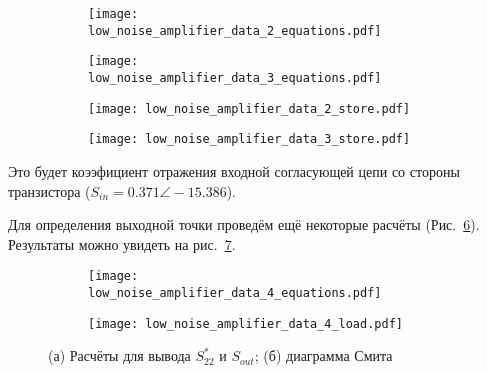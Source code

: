 \begin{figure}[!ht]
    \centering
    \begin{subfigure}[b]{0.45\textwidth}
        \centering
        \texttt{[image: low\_noise\_amplifier\_data\_2\_equations.pdf]}
        \caption{}%
        \label{fig:low_noise_amplifier_data_2_equations}
    \end{subfigure}
    \hfill
    \begin{subfigure}[b]{0.45\textwidth}
        \centering
        \texttt{[image: low\_noise\_amplifier\_data\_3\_equations.pdf]}
        \caption{}%
        \label{fig:low_noise_amplifier_data_3_equations}
    \end{subfigure}
    \vfill
    \begin{subfigure}[b]{0.45\textwidth}
        \centering
        \texttt{[image: low\_noise\_amplifier\_data\_2\_store.pdf]}
        \caption{}%
        \label{fig:low_noise_amplifier_data_2_store}
    \end{subfigure}
    \hfill
    \begin{subfigure}[b]{0.45\textwidth}
        \centering
        \texttt{[image: low\_noise\_amplifier\_data\_3\_store.pdf]}
        \caption{}%
        \label{fig:low_noise_amplifier_data_3_store}
    \end{subfigure}
\end{figure}

Это будет коээфициент отражения входной согласующей цепи со стороны транзистора ($S_{in} = 0.371 \angle -15.386$).

Для определения выходной точки проведём ещё некоторые расчёты (Рис.~\ref{fig:low_noise_amplifier_data_4_equations}). Результаты можно увидеть на рис.~\ref{fig:low_noise_amplifier_data_4_load}.

\begin{figure}[!ht]
    \centering
    \begin{subfigure}[b]{0.55\textwidth}
        \centering
        \texttt{[image: low\_noise\_amplifier\_data\_4\_equations.pdf]}
        \caption{}%
        \label{fig:low_noise_amplifier_data_4_equations}
    \end{subfigure}
    \hfill
    \begin{subfigure}[b]{0.55\textwidth}
        \centering
        \texttt{[image: low\_noise\_amplifier\_data\_4\_load.pdf]}
        \caption{}%
        \label{fig:low_noise_amplifier_data_4_load}
    \end{subfigure}
    \caption{%
        (а) Расчёты для вывода $S_{22}^*$ и $S_{out}$;
        (б) диаграмма Смита
    }%
    \label{fig:low_noise_amplifier_data_4_1}
\end{figure}

